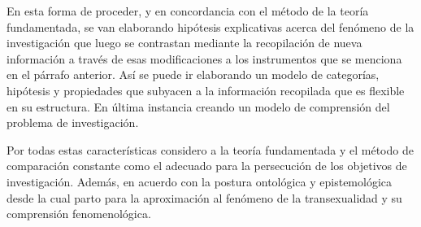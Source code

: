 	En esta forma de proceder, y en concordancia con el método de la teoría
fundamentada, se van elaborando hipótesis explicativas acerca del fenómeno de la
investigación que luego se contrastan mediante la recopilación de nueva
información a través de esas modificaciones a los instrumentos que se menciona
en el párrafo anterior. Así se puede ir elaborando un modelo de categorías,
hipótesis y propiedades que subyacen a la información recopilada que es flexible
en su estructura. En última instancia creando un modelo de comprensión del
problema de investigación.

	Por todas estas características considero a la teoría fundamentada y el método
de comparación constante como el adecuado para la persecución de los objetivos
de investigación. Además, en acuerdo con la postura ontológica y
epistemológica desde la cual parto para la aproximación al fenómeno de la
transexualidad y su comprensión fenomenológica.
